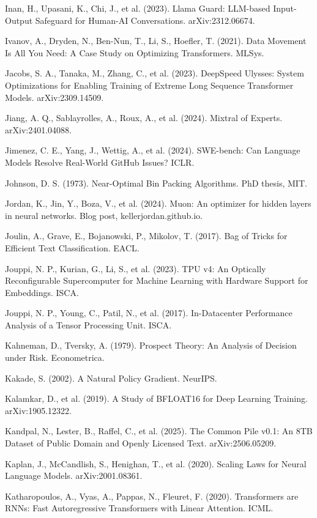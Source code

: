 {\begin{enumerate}[leftmargin=*,itemsep=1pt,label={[\arabic*]}]
\item Inan, H., Upasani, K., Chi, J., et al. (2023). Llama Guard: LLM-based Input-Output Safeguard for Human-AI Conversations. arXiv:2312.06674.
\item Ivanov, A., Dryden, N., Ben-Nun, T., Li, S., Hoefler, T. (2021). Data Movement Is All You Need: A Case Study on Optimizing Transformers. MLSys.
\item Jacobs, S. A., Tanaka, M., Zhang, C., et al. (2023). DeepSpeed Ulysses: System Optimizations for Enabling Training of Extreme Long Sequence Transformer Models. arXiv:2309.14509.
\item Jiang, A. Q., Sablayrolles, A., Roux, A., et al. (2024). Mixtral of Experts. arXiv:2401.04088.
\item Jimenez, C. E., Yang, J., Wettig, A., et al. (2024). SWE-bench: Can Language Models Resolve Real-World GitHub Issues? ICLR.
\item Johnson, D. S. (1973). Near-Optimal Bin Packing Algorithms. PhD thesis, MIT.
\item Jordan, K., Jin, Y., Boza, V., et al. (2024). Muon: An optimizer for hidden layers in neural networks. Blog post, kellerjordan.github.io.
\item Joulin, A., Grave, E., Bojanowski, P., Mikolov, T. (2017). Bag of Tricks for Efficient Text Classification. EACL.
\item Jouppi, N. P., Kurian, G., Li, S., et al. (2023). TPU v4: An Optically Reconfigurable Supercomputer for Machine Learning with Hardware Support for Embeddings. ISCA.
\item Jouppi, N. P., Young, C., Patil, N., et al. (2017). In-Datacenter Performance Analysis of a Tensor Processing Unit. ISCA.
\item Kahneman, D., Tversky, A. (1979). Prospect Theory: An Analysis of Decision under Risk. Econometrica.
\item Kakade, S. (2002). A Natural Policy Gradient. NeurIPS.
\item Kalamkar, D., et al. (2019). A Study of BFLOAT16 for Deep Learning Training. arXiv:1905.12322.
\item Kandpal, N., Lester, B., Raffel, C., et al. (2025). The Common Pile v0.1: An 8TB Dataset of Public Domain and Openly Licensed Text. arXiv:2506.05209.
\item Kaplan, J., McCandlish, S., Henighan, T., et al. (2020). Scaling Laws for Neural Language Models. arXiv:2001.08361.
\item Katharopoulos, A., Vyas, A., Pappas, N., Fleuret, F. (2020). Transformers are RNNs: Fast Autoregressive Transformers with Linear Attention. ICML.

\end{enumerate}}
